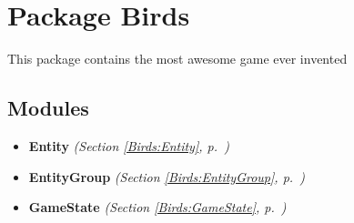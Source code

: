 %
%
%


\section{Package Birds}

    \label{Birds}
This package contains the most awesome game ever invented



\subsection{Modules}

\begin{itemize}
\setlength{\parskip}{0ex}
\item \textbf{Entity}
  \textit{(Section \ref{Birds:Entity}, p.~\pageref{Birds:Entity})}

\item \textbf{EntityGroup}
  \textit{(Section \ref{Birds:EntityGroup}, p.~\pageref{Birds:EntityGroup})}

\item \textbf{GameState}
  \textit{(Section \ref{Birds:GameState}, p.~\pageref{Birds:GameState})}

\end{itemize}

